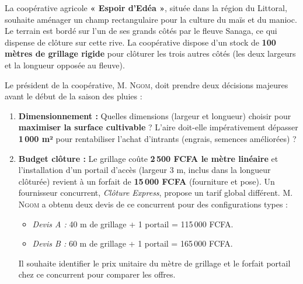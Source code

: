 \documentclass[11pt]{article}
\begin{document}
La coopérative agricole \textbf{« Espoir d'Edéa »}, située dans la région du Littoral, souhaite aménager un champ rectangulaire pour la culture du maïs et du manioc. Le terrain est bordé sur l'un de ses grands côtés par le fleuve Sanaga, ce qui dispense de clôture sur cette rive. La coopérative dispose d'un stock de \textbf{100 mètres de grillage rigide} pour clôturer les trois autres côtés (les deux largeurs et la longueur opposée au fleuve).

Le président de la coopérative, M. \textsc{Ngom}, doit prendre deux décisions majeures avant le début de la saison des pluies :
\begin{enumerate}
    \item \textbf{Dimensionnement :} Quelles dimensions (largeur et longueur) choisir pour \textbf{maximiser la surface cultivable} ? L'aire doit-elle impérativement dépasser \textbf{1\,000 m²} pour rentabiliser l'achat d'intrants (engrais, semences améliorées) ?
    \item \textbf{Budget clôture :} Le grillage coûte \textbf{2\,500 FCFA le mètre linéaire} et l'installation d'un portail d'accès (largeur 3 m, inclus dans la longueur clôturée) revient à un forfait de \textbf{15\,000 FCFA} (fourniture et pose). Un fournisseur concurrent, \textit{Clôture Express}, propose un tarif global différent. M. \textsc{Ngom} a obtenu deux devis de ce concurrent pour des configurations types :
    \begin{itemize}
        \item \textit{Devis A :} 40 m de grillage + 1 portail = 115\,000 FCFA.
        \item \textit{Devis B :} 60 m de grillage + 1 portail = 165\,000 FCFA.
    \end{itemize}
    Il souhaite identifier le prix unitaire du mètre de grillage et le forfait portail chez ce concurrent pour comparer les offres.
\end{enumerate}
\end{document}
